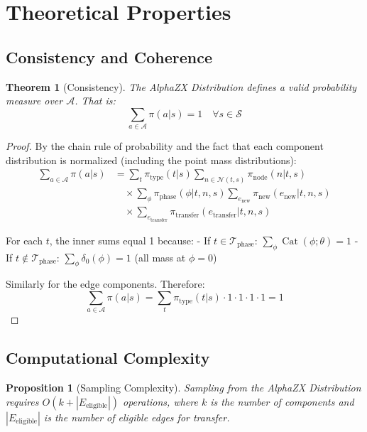 \documentclass[11pt,a4paper]{article}
\newtheorem{theorem}{Theorem}
\newtheorem{proposition}{Proposition}
\DeclareMathOperator{\Cat}{Cat}
\newcommand{\cA}{\mathcal{A}}
\newcommand{\cS}{\mathcal{S}}
\newcommand{\cT}{\mathcal{T}}
\newcommand{\cN}{\mathcal{N}}
\begin{document}
\section{Theoretical Properties}

\subsection{Consistency and Coherence}

\begin{theorem}[Consistency]
The AlphaZX Distribution defines a valid probability measure over $\cA$. That is:
\[
\sum_{a \in \cA} \pi(a|s) = 1 \quad \forall s \in \cS
\]
\end{theorem}

\begin{proof}
By the chain rule of probability and the fact that each component distribution is normalized (including the point mass distributions):
\begin{align}
\sum_{a \in \cA} \pi(a|s) &= \sum_t \pi_{\text{type}}(t|s) \sum_{n \in \cN(t,s)} \pi_{\text{node}}(n|t,s) \\
&\quad \times \sum_\phi \pi_{\text{phase}}(\phi|t,n,s) \sum_{e_{\text{new}}} \pi_{\text{new}}(e_{\text{new}}|t,n,s) \\
&\quad \times \sum_{e_{\text{transfer}}} \pi_{\text{transfer}}(e_{\text{transfer}}|t,n,s)
\end{align}

For each $t$, the inner sums equal 1 because:
- If $t \in \cT_{\text{phase}}$: $\sum_\phi \Cat(\phi; \theta) = 1$
- If $t \notin \cT_{\text{phase}}$: $\sum_\phi \delta_0(\phi) = 1$ (all mass at $\phi = 0$)

Similarly for the edge components. Therefore:
\[
\sum_{a \in \cA} \pi(a|s) = \sum_t \pi_{\text{type}}(t|s) \cdot 1 \cdot 1 \cdot 1 \cdot 1 = 1
\]
\end{proof}

\subsection{Computational Complexity}

\begin{proposition}[Sampling Complexity]
Sampling from the AlphaZX Distribution requires $O(k + |E_{\text{eligible}}|)$ operations, where $k$ is the number of components and $|E_{\text{eligible}}|$ is the number of eligible edges for transfer.
\end{proposition}
\end{document}

